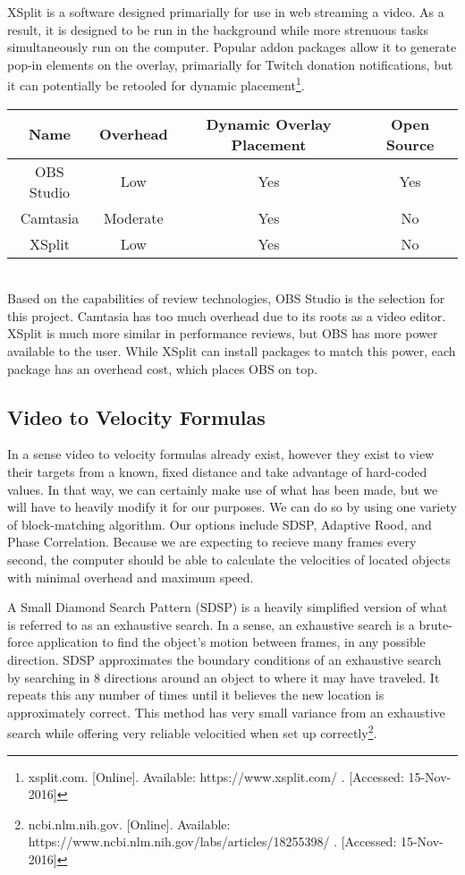 \documentclass[letterpaper,10pt,onecolumn,draftclsnofoot]{IEEEtran}
\begin{document}
XSplit is a software designed primarially for use in web streaming a video.  As a result, it is designed to be run in the background while more strenuous tasks simultaneously run on the computer.  Popular addon packages allow it to generate pop-in elements on the overlay, primarially for Twitch donation notifications, but it can potentially be retooled for dynamic placement\footnote{xsplit.com. [Online]. Available: https://www.xsplit.com/ . [Accessed: 15-Nov-2016] }. \\

\begin{tabular}{|c|c|c|c|}
  \hline
  \textbf{Name} & \textbf{Overhead} & \textbf{Dynamic Overlay Placement} & \textbf{Open Source} \\
  \hline
  OBS Studio & Low & Yes & Yes \\ 
  \hline
  Camtasia & Moderate & Yes & No  \\ 
  \hline
  XSplit & Low & Yes & No \\ 
  \hline
\end{tabular} \\

Based on the capabilities of review technologies, OBS Studio is the selection for this project.  Camtasia has too much overhead due to its roots as a video editor.  XSplit is much more similar in performance reviews, but OBS has more power available to the user.  While XSplit can install packages to match this power, each package has an overhead cost, which places OBS on top.

\newpage
\subsection{Video to Velocity Formulas} %

In a sense video to velocity formulas already exist, however they exist to view their targets from a known, fixed distance and take advantage of hard-coded values.  In that way, we can certainly make use of what has been made, but we will have to heavily modify it for our purposes.  We can do so by using one variety of block-matching algorithm.  Our options include SDSP, Adaptive Rood, and Phase Correlation.  Because we are expecting to recieve many frames every second, the computer should be able to calculate the velocities of located objects with minimal overhead and maximum speed.

A Small Diamond Search Pattern (SDSP) is a heavily simplified version of what is referred to as an exhaustive search.  In a sense, an exhaustive search is a brute-force application to find the object's motion between frames, in any possible direction.  SDSP approximates the boundary conditions of an exhaustive search by searching in 8 directions around an object to where it may have traveled.  It repeats this any number of times until it believes the new location is approximately correct.  This method has very small variance from an exhaustive search while offering very reliable velocitied when set up correctly\footnote{ncbi.nlm.nih.gov. [Online]. Available: https://www.ncbi.nlm.nih.gov/labs/articles/18255398/ . [Accessed: 15-Nov-2016] }.
\end{document}
